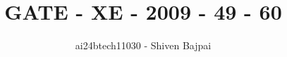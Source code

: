 \documentclass[journal]{IEEEtran}
\begin{document}
\onecolumn

\vspace{3cm}

\renewcommand{\thefigure}{\theenumi}
\renewcommand{\thetable}{\theenumi}

\title{GATE - XE - 2009 - 49 - 60}
\author{ai24btech11030 - Shiven Bajpai} 
\maketitle

\iffalse
\begin{multicols}{4}
\begin{enumerate}
    \item 
    \item 
    \item 
    \item 
\end{enumerate}
\end{multicols}
\fi
\end{document}
